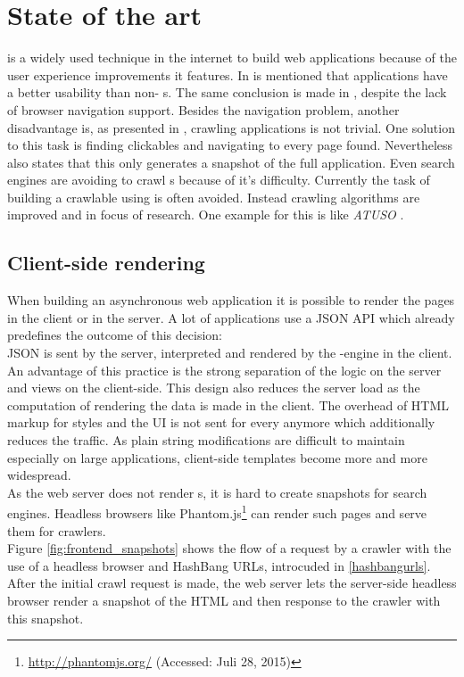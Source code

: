 \section{State of the art\label{chap:state_of_the_art}}
\ajax{} is a widely used technique in the internet to build web applications because of the user experience improvements it features.
In \cite{roodt2006effect} is mentioned that \ajax{} applications have a better usability than non-\ajax{} \webSite{}s.
The same conclusion is made in \cite{kluge2007effects}, despite the lack of browser navigation support.
Besides the navigation problem, another disadvantage is, as presented in \cite{mesbah2009analysis}, crawling \ajax{} applications is not trivial.
One solution to this task is finding clickables and navigating to every page found.
Nevertheless \cite{mesbah2009analysis} also states that this only generates a snapshot of the full application.
Even search engines are avoiding to crawl \webSite{}s because of it's difficulty\cite{duda2009ajax}.
Currently the task of building a crawlable \singlePageApplication{} using \ajax{} is often avoided. Instead crawling algorithms are improved and in focus of research. One example for this is  like \emph{ATUSO} \cite{mesbah2012invariant}.

\subsection{Client-side rendering\label{sec:state_client_side_rendering}}
When building an asynchronous web application it is possible to render the pages in the client or in the server.
A lot of \ajax{} applications use a JSON API which already predefines the outcome of this decision:
\\
JSON is sent by the server, interpreted and rendered by the \ajax{}-engine in the client.
An advantage of this practice is the strong separation of the logic on the server and views on the client-side.
This \webApplication{} design also reduces the server load as the computation of rendering the data is made in the client.
The overhead of HTML markup for styles and the UI is not sent for every \webPage{} anymore which additionally reduces the traffic.
As plain string modifications are difficult to maintain especially on large applications, client-side templates become more and more widespread.
\\
As the web server does not render \webPage{}s, it is hard to create snapshots for search engines.
Headless browsers like Phantom.js\footnote{\url{http://phantomjs.org/} (Accessed: Juli 28, 2015)} can render such pages and serve them for crawlers.
\\
Figure \ref{fig:frontend_snapshots} shows the flow of a request by a crawler with the use of a headless browser and HashBang URLs, introcuded in \ref{hashbangurls}.
After the initial crawl request is made, the web server lets the server-side headless browser render a snapshot of the HTML and then response to the crawler with this snapshot.

